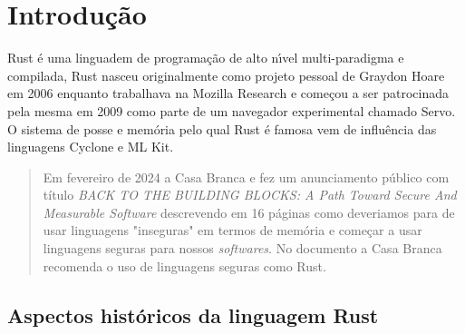 
\chapter{ Introdu\c{c}\~{a}o}

Rust \'{e} uma linguadem de programa\c{c}\~{a}o de alto n\'{\i}vel multi-paradigma e compilada, Rust nasceu originalmente como projeto pessoal de Graydon Hoare em 2006 enquanto trabalhava na Mozilla Research e come\c{c}ou a ser patrocinada pela mesma em 2009 como parte de um navegador experimental chamado Servo. O sistema de posse e mem\'{o}ria pelo qual Rust \'{e} famosa vem de influ\^{e}ncia das linguagens Cyclone e ML Kit.


\begin{quote}


  Em fevereiro de 2024 a Casa Branca e fez um anunciamento p\'{u}blico com t\'{i}tulo \textit{BACK TO THE BUILDING BLOCKS: A Path Toward Secure And Measurable Software} descrevendo em 16 p\'{a}ginas como deveriamos para de usar linguagens "inseguras" em termos de mem\'{o}ria e come\c{c}ar a usar linguagens seguras para nossos \textit{softwares}. No documento a Casa Branca recomenda o uso de linguagens seguras como Rust.

\end{quote}


\section{Aspectos hist\'{o}ricos da linguagem Rust}

